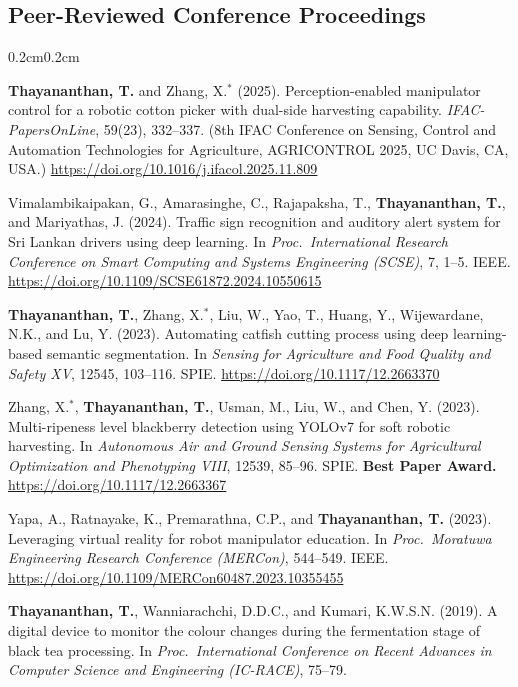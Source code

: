 \documentclass[10pt, letterpaper]{article}
\newcommand{\textbfr}[1]{\textbf{#1}}
\newenvironment{onecolentry}{%
    \begin{adjustwidth}{0.2cm}{0.2cm}
}{\end{adjustwidth}}
\newenvironment{pubsC}{%
  \begin{enumerate}[label={[C\arabic*]}, leftmargin=1.15cm, labelsep=0.2cm,
                    topsep=0.08cm, parsep=0.08cm, partopsep=0pt, itemsep=0pt]
}{\end{enumerate}}
\begin{document}
\subsection{Peer-Reviewed Conference Proceedings}
\begin{onecolentry}
\begin{pubsC}
    \item \textbfr{Thayananthan, T.} and Zhang, X.$^{*}$ (2025).
    Perception-enabled manipulator control for a robotic cotton picker with
    dual-side harvesting capability. \emph{IFAC-PapersOnLine}, 59(23), 332--337.
    (8th IFAC Conference on Sensing, Control and Automation Technologies for
    Agriculture, AGRICONTROL 2025, UC Davis, CA, USA.)
    \url{https://doi.org/10.1016/j.ifacol.2025.11.809}

    \item Vimalambikaipakan, G., Amarasinghe, C., Rajapaksha, T.,
    \textbfr{Thayananthan, T.}, and Mariyathas, J. (2024).
    Traffic sign recognition and auditory alert system for Sri Lankan drivers using
    deep learning. In \emph{Proc.\ International Research Conference on Smart
    Computing and Systems Engineering (SCSE)}, 7, 1--5. IEEE.
    \url{https://doi.org/10.1109/SCSE61872.2024.10550615}

    \item \textbfr{Thayananthan, T.}, Zhang, X.$^{*}$, Liu, W., Yao, T., Huang, Y.,
    Wijewardane, N.K., and Lu, Y. (2023). Automating catfish cutting process using
    deep learning-based semantic segmentation. In \emph{Sensing for Agriculture and
    Food Quality and Safety XV}, 12545, 103--116. SPIE.
    \url{https://doi.org/10.1117/12.2663370}

    \item Zhang, X.$^{*}$, \textbfr{Thayananthan, T.}, Usman, M., Liu, W., and Chen, Y.
    (2023). Multi-ripeness level blackberry detection using YOLOv7 for soft robotic
    harvesting. In \emph{Autonomous Air and Ground Sensing Systems for Agricultural
    Optimization and Phenotyping VIII}, 12539, 85--96. SPIE.
    \textbf{Best Paper Award.} \url{https://doi.org/10.1117/12.2663367}

    \item Yapa, A., Ratnayake, K., Premarathna, C.P., and \textbfr{Thayananthan, T.}
    (2023). Leveraging virtual reality for robot manipulator education. In
    \emph{Proc.\ Moratuwa Engineering Research Conference (MERCon)}, 544--549. IEEE.
    \url{https://doi.org/10.1109/MERCon60487.2023.10355455}

    \item \textbfr{Thayananthan, T.}, Wanniarachchi, D.D.C., and Kumari, K.W.S.N.
    (2019). A digital device to monitor the colour changes during the fermentation
    stage of black tea processing. In \emph{Proc.\ International Conference on Recent
    Advances in Computer Science and Engineering (IC-RACE)}, 75--79.
\end{pubsC}
\end{onecolentry}
\vspace{0.12cm}
\end{document}
